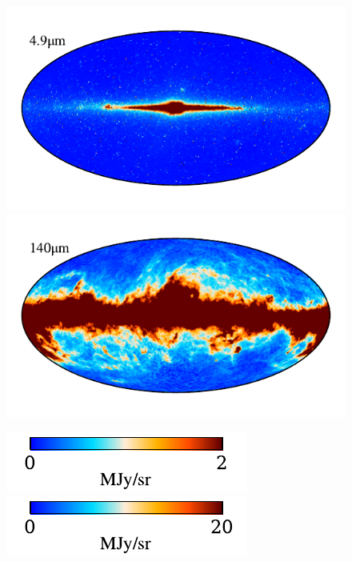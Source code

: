 \documentclass{aa}
\begin{document}
\begin{figure}
  
    \includegraphics[width=0.8\columnwidth]{figs/freq_maps/freq_04_c0001_000019.pdf}\includegraphics[width=0.8\columnwidth]{figs/freq_maps/freq_09_c0001_000019.pdf}
    \vspace*{-0.5cm}

    \includegraphics[width=0.4\columnwidth]{figs/freq_maps/freq_cbar_04_c0001_000019.pdf}\hspace{3.6cm}\includegraphics[width=0.4\columnwidth]{figs/freq_maps/freq_cbar_09_c0001_000019.pdf}


\end{figure}
\end{document}
